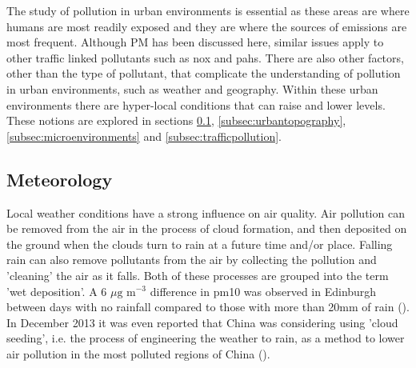 The study of pollution in urban environments is essential as these areas are where humans are most readily exposed and they are where the sources of emissions are most frequent. Although PM has been discussed here, similar issues apply to other traffic linked pollutants such as \gls{nox} and \gls{pahs}. There are also other factors, other than the type of pollutant, that complicate the understanding of pollution in urban environments, such as weather and geography. Within these urban environments there are hyper-local conditions that can raise and lower levels. These notions are explored in sections \ref{subsec:meteorology}, \ref{subsec:urbantopography}, \ref{subsec:microenvironments} and \ref{subsec:trafficpollution}.


\subsection{Meteorology}
\label{subsec:meteorology}

Local weather conditions have a strong influence on air quality.
Air pollution can be removed from the air in the process of cloud formation, and then deposited on the ground when the clouds turn to rain at a future time and/or place. Falling rain can also remove pollutants from the air by collecting the pollution and 'cleaning' the air as it falls. Both of these processes are grouped into the term 'wet deposition'. A 6 $\mu \text{g m}^{-3}$ difference in \gls{pm10} was observed in Edinburgh between days with no rainfall compared to those with more than 20mm of rain (\cite{DEFRA2007}). In December 2013 it was even reported that China was considering using 'cloud seeding', i.e. the process of engineering the weather to rain, as a method to lower air pollution in the most polluted regions of China (\cite{Slezak2013}).

